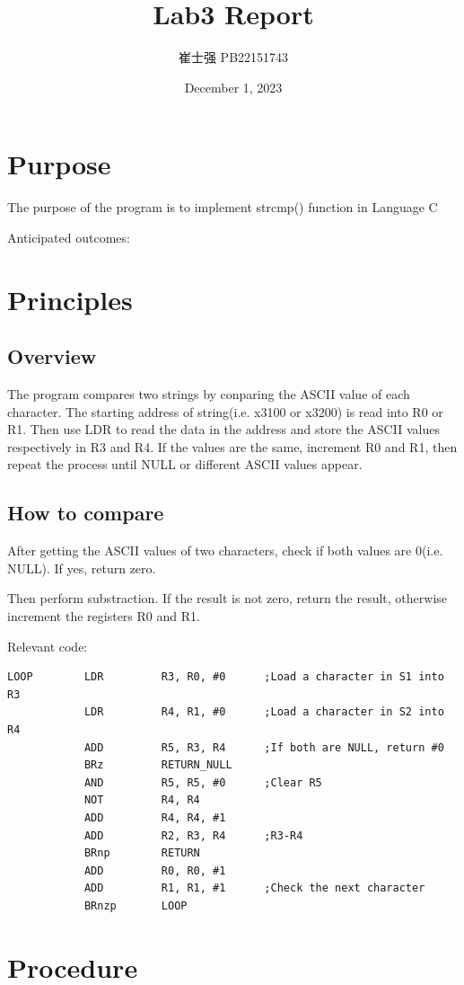 \documentclass[UTF8]{ctexart}
\title{Lab3 Report}
\author{崔士强 PB22151743}
\date{December 1, 2023}
\begin{document}
\maketitle
\section{Purpose}
The purpose of the program is to implement strcmp() function in Language C

Anticipated outcomes:

\section{Principles}
\subsection{Overview}
The program compares two strings by conparing the ASCII value of each character. 
The starting address of string(i.e. x3100 or x3200) is read into R0 or R1. 
Then use LDR to read the data in the address and store the ASCII values respectively in R3 and R4.
If the values are the same, increment R0 and R1, then repeat the process until NULL or different ASCII values appear.
\subsection{How to compare}

After getting the ASCII values of two characters, check if both values are 0(i.e. NULL).
If yes, return zero.

Then perform substraction.
If the result is not zero, return the result, otherwise increment the registers R0 and R1.

Relevant code:
\begin{lstlisting}
LOOP        LDR         R3, R0, #0      ;Load a character in S1 into R3
            LDR         R4, R1, #0      ;Load a character in S2 into R4
            ADD         R5, R3, R4      ;If both are NULL, return #0
            BRz         RETURN_NULL
            AND         R5, R5, #0      ;Clear R5
            NOT         R4, R4
            ADD         R4, R4, #1
            ADD         R2, R3, R4      ;R3-R4
            BRnp        RETURN
            ADD         R0, R0, #1
            ADD         R1, R1, #1      ;Check the next character
            BRnzp       LOOP
\end{lstlisting}

\section{Procedure}
\end{document}
